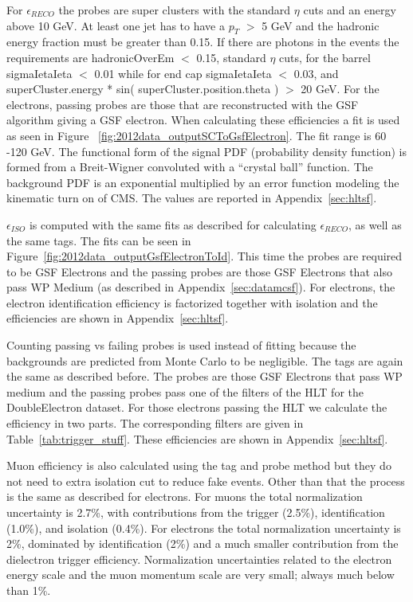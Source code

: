 For $\epsilon_{RECO}$ the probes are super clusters with the standard $\eta$ cuts and an energy above 10 GeV. At least one jet has to have a $p_T$ $>$ 5 GeV and the hadronic energy fraction must be greater than 0.15. If there are photons in the events the requirements are hadronicOverEm $<$ 0.15, standard $\eta$ cuts, for the barrel sigmaIetaIeta $<$ 0.01 while for end cap sigmaIetaIeta $<$ 0.03, and superCluster.energy * sin( superCluster.position.theta ) $>$ 20 GeV. For the electrons, passing probes are those that are reconstructed with the GSF algorithm giving a GSF electron.  When calculating these efficiencies a fit is used as seen in Figure ~\ref{fig:2012data_outputSCToGsfElectron}.  The fit range is 60 -120 GeV. The functional form of the signal PDF (probability density function) is formed from a Breit-Wigner convoluted with a ``crystal ball'' function. The background PDF is an exponential multiplied by an error function modeling the kinematic turn on of CMS. The values are reported in Appendix~\ref{sec:hltsf}.


$\epsilon_{ISO}$ is computed with the same fits as described for calculating $\epsilon_{RECO}$, as well as the same tags. The fits can be seen in Figure~\ref{fig:2012data_outputGsfElectronToId}. This time the probes are required to be GSF Electrons and the passing probes are those GSF Electrons that also pass WP Medium (as described in Appendix~\ref{sec:datamcsf}). For electrons, the electron identification efficiency is factorized together with isolation and the efficiencies are shown in Appendix~\ref{sec:hltsf}.


Counting passing vs failing probes is used instead of fitting because the backgrounds are predicted from Monte Carlo to be negligible. The tags are again the same as described before. The probes are those GSF Electrons that pass WP medium and the passing probes pass one of the filters of the HLT for the DoubleElectron dataset. For those electrons passing the HLT we calculate the efficiency in two parts.  The corresponding filters are given in Table~\ref{tab:trigger_stuff}. These efficiencies are shown in Appendix~\ref{sec:hltsf}.

Muon efficiency is also calculated using the tag and probe method but they do not need to extra isolation cut to reduce fake events.  Other than that the process is the same as described for electrons.  For muons the total normalization uncertainty is 2.7\%, with contributions from the trigger (2.5\%), identification (1.0\%), and isolation (0.4\%). For electrons the total normalization uncertainty is 2\%, dominated by identification (2\%) and a much smaller contribution from the dielectron trigger efficiency. Normalization uncertainties related to the electron energy scale and the muon momentum scale are very small; always much below than 1\%.


